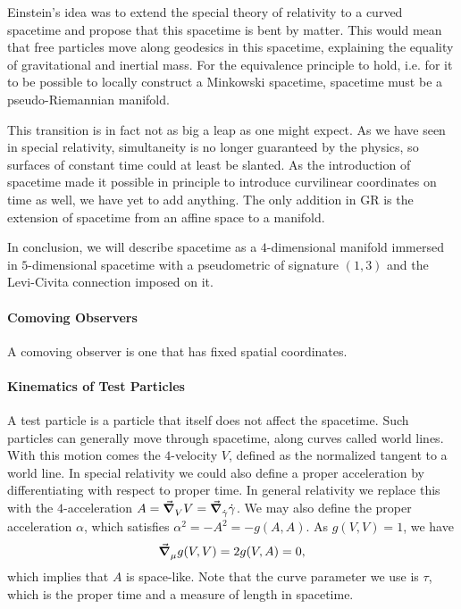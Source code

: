 Einstein's idea was to extend the special theory of relativity to a curved spacetime and propose that this spacetime is bent by matter. This would mean that free particles move along geodesics in this spacetime, explaining the equality of gravitational and inertial mass. For the equivalence principle to hold, i.e. for it to be possible to locally construct a Minkowski spacetime, spacetime must be a pseudo-Riemannian manifold.

This transition is in fact not as big a leap as one might expect. As we have seen in special relativity, simultaneity is no longer guaranteed by the physics, so surfaces of constant time could at least be slanted. As the introduction of spacetime made it possible in principle to introduce curvilinear coordinates on time as well, we have yet to add anything. The only addition in GR is the extension of spacetime from an affine space to a manifold.

In conclusion, we will describe spacetime as a $4$-dimensional manifold immersed in $5$-dimensional spacetime with a pseudometric of signature $(1, 3)$ and the Levi-Civita connection imposed on it.

\paragraph{Comoving Observers}
A comoving observer is one that has fixed spatial coordinates.

\paragraph{Kinematics of Test Particles}
A test particle is a particle that itself does not affect the spacetime. Such particles can generally move through spacetime, along curves called world lines. With this motion comes the $4$-velocity $V$, defined as the normalized tangent to a world line. In special relativity we could also define a proper acceleration by differentiating with respect to proper time. In general relativity we replace this with the $4$-acceleration $A = \grad_{V}^{}{V} = \grad_{\dot{\gamma}}^{}{\dot{\gamma}}$.  We may also define the proper acceleration $\alpha$, which satisfies $\alpha^{2} = -A^{2} = -g(A, A)$. As $g(V, V) = 1$, we have
\begin{align*}
	\grad_{\mu}^{}{g(V, V)} = 2g(V, A) = 0,
\end{align*}
which implies that $A$ is space-like. Note that the curve parameter we use is $\tau$, which is the proper time and a measure of length in spacetime.

